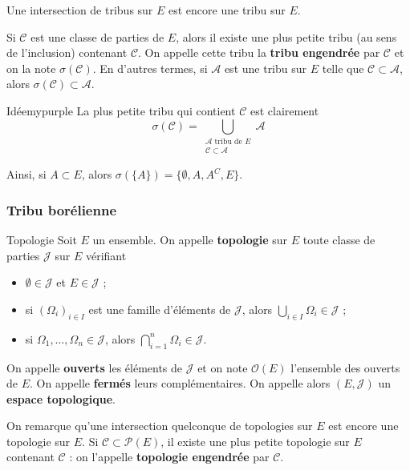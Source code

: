     Une intersection de tribus sur $E$ est encore une tribu sur $E$.

    \begin{defitheo}{}{}
        Si $\mathcal{C}$ est une classe de parties de $E$, alors il existe une plus petite tribu (au sens de l’inclusion) contenant $\mathcal{C}$. On appelle cette tribu la \textbf{tribu engendrée} par $\mathcal{C}$ et on la note $\sigma(\mathcal{C})$. En d’autres termes, si $\mathcal{A}$ est une tribu sur $E$ telle que $\mathcal{C} \subset \mathcal{A}$, alors $\sigma(\mathcal{C}) \subset \mathcal{A}$.
    \end{defitheo}

    \begin{demo}{Idée}{mypurple}
        La plus petite tribu qui contient $\mathcal{C}$ est clairement 
        \[ \sigma(\mathcal{C}) = \bigcup_{\substack{\mathcal{A} \text{ tribu de } E \\ \mathcal{C} \subset \mathcal{A}}} \mathcal{A} \]
    \end{demo}

    Ainsi, si $A \subset E$, alors $\sigma(\{A\}) = \{ \emptyset, A, A^{C}, E \}$.

    \subsubsection{Tribu borélienne}

    \begin{defi}{Topologie}{}
        Soit $E$ un ensemble. On appelle \textbf{topologie} sur $E$ toute classe de parties $\mathcal{J}$ sur $E$ vérifiant 
        \begin{itemize}
            \item $\emptyset \in \mathcal{J}$ et $E \in \mathcal{J}$ ;
            \item si $(\Omega_i)_{i \in I}$ est une famille d’éléments de $\mathcal{J}$, alors $\bigcup_{i \in I} \Omega_i \in \mathcal{J}$ ;
            \item si $\Omega_1,\ldots,\Omega_n \in \mathcal{J}$, alors $\bigcap_{i=1}^n \Omega_i \in \mathcal{J}$.
        \end{itemize}
        On appelle \textbf{ouverts} les éléments de $\mathcal{J}$ et on note $\mathcal{O}(E)$ l’ensemble des ouverts de $E$. On appelle \textbf{fermés} leurs complémentaires. On appelle alors $(E,\mathcal{J})$ un \textbf{espace topologique}.
    \end{defi}

    On remarque qu’une intersection quelconque de topologies sur $E$ est encore une topologie sur $E$. Si $\mathcal{C} \subset \mathcal{P}(E)$, il existe une plus petite topologie sur $E$ contenant $\mathcal{C}$ : on l’appelle \textbf{topologie engendrée} par $\mathcal{C}$.

